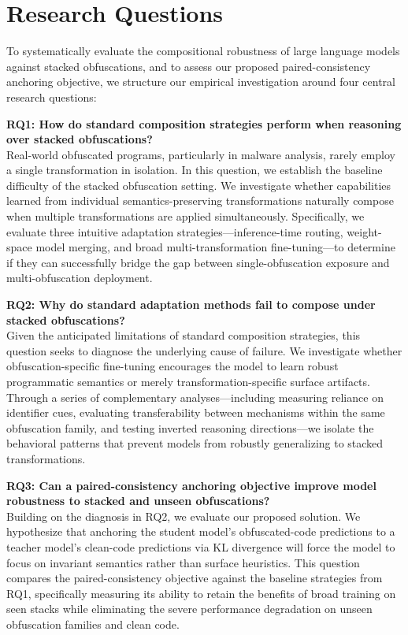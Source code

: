 \section{Research Questions}
\label{sec:rqs}

To systematically evaluate the compositional robustness of large language models against stacked obfuscations, and to assess our proposed paired-consistency anchoring objective, we structure our empirical investigation around four central research questions:

\vspace{0.5em}
\noindent
\textbf{RQ1: How do standard composition strategies perform when reasoning over stacked obfuscations?} \\
Real-world obfuscated programs, particularly in malware analysis, rarely employ a single transformation in isolation. In this question, we establish the baseline difficulty of the stacked obfuscation setting. We investigate whether capabilities learned from individual semantics-preserving transformations naturally compose when multiple transformations are applied simultaneously. Specifically, we evaluate three intuitive adaptation strategies---inference-time routing, weight-space model merging, and broad multi-transformation fine-tuning---to determine if they can successfully bridge the gap between single-obfuscation exposure and multi-obfuscation deployment.

\vspace{0.5em}
\noindent
\textbf{RQ2: Why do standard adaptation methods fail to compose under stacked obfuscations?} \\
Given the anticipated limitations of standard composition strategies, this question seeks to diagnose the underlying cause of failure. We investigate whether obfuscation-specific fine-tuning encourages the model to learn robust programmatic semantics or merely transformation-specific surface artifacts. Through a series of complementary analyses---including measuring reliance on identifier cues, evaluating transferability between mechanisms within the same obfuscation family, and testing inverted reasoning directions---we isolate the behavioral patterns that prevent models from robustly generalizing to stacked transformations.

\vspace{0.5em}
\noindent
\textbf{RQ3: Can a paired-consistency anchoring objective improve model robustness to stacked and unseen obfuscations?} \\
Building on the diagnosis in RQ2, we evaluate our proposed solution. We hypothesize that anchoring the student model's obfuscated-code predictions to a teacher model's clean-code predictions via KL divergence will force the model to focus on invariant semantics rather than surface heuristics. This question compares the paired-consistency objective against the baseline strategies from RQ1, specifically measuring its ability to retain the benefits of broad training on seen stacks while eliminating the severe performance degradation on unseen obfuscation families and clean code.

